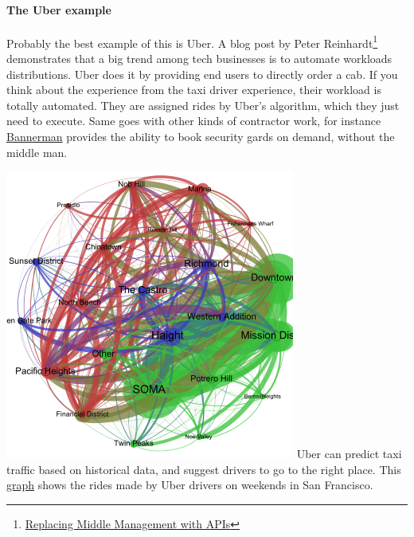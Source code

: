 \documentclass[12pt]{article}
\begin{document}
{\paragraph{The Uber example}

Probably the best example of this is Uber. A blog post by Peter
Reinhardt\footnote{\href{http://rein.pk/replacing-middle-management-with-apis/}
{Replacing Middle Management with APIs}} demonstrates that a big trend among
tech businesses is to automate workloads distributions. Uber does it by providing
end users to directly order a cab. If you think about the experience from the
taxi driver experience, their workload is totally automated. They are assigned
rides by Uber's algorithm, which they just need to execute. Same goes with other
kinds of contractor work, for instance \href{https://www.getbannerman.com/}
{Bannerman} provides the ability to book security gards on demand, without the
middle man.

\smallskip

\includegraphics[width=\textwidth]{uber-graph}
Uber can predict taxi traffic based on historical data, and suggest drivers to
go to the right place. This
\href{http://blogs.mathworks.com/loren/2014/09/06/analyzing-uber-ride-sharing-gps-data/}
{graph} shows the rides made by Uber drivers on weekends in San Francisco.

}
\end{document}
